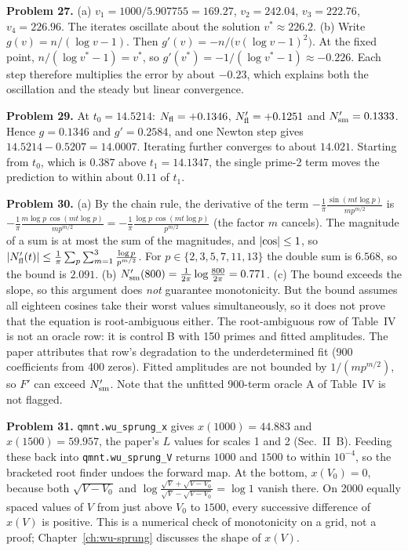 \textbf{Problem 27.} (a) $v_1=1000/5.907755=169.27$, $v_2=242.04$, $v_3=222.76$, $v_4=226.96$. The iterates oscillate about the solution $v^\ast\approx226.2$. (b) Write $g(v)=n/(\log v-1)$. Then $g'(v)=-n/\bigl(v(\log v-1)^2\bigr)$. At the fixed point, $n/(\log v^\ast-1)=v^\ast$, so $g'(v^\ast)=-1/(\log v^\ast-1)\approx-0.226$. Each step therefore multiplies the error by about $-0.23$, which explains both the oscillation and the steady but linear convergence.

\textbf{Problem 29.} At $t_0=14.5214$: $N_{\mathrm{fl}}=+0.1346$, $N_{\mathrm{fl}}'=+0.1251$ and $N_{\mathrm{sm}}'=0.1333$. Hence $g=0.1346$ and $g'=0.2584$, and one Newton step gives $14.5214-0.5207=14.0007$. Iterating further converges to about $14.021$. Starting from $t_0$, which is $0.387$ above $t_1=14.1347$, the single prime-2 term moves the prediction to within about $0.11$ of $t_1$.

\textbf{Problem 30.} (a) By the chain rule, the derivative of the term $-\frac1\pi\frac{\sin(mt\log p)}{mp^{m/2}}$ is $-\frac1\pi\frac{m\log p\,\cos(mt\log p)}{mp^{m/2}}=-\frac1\pi\frac{\log p\,\cos(mt\log p)}{p^{m/2}}$ (the factor $m$ cancels). The magnitude of a sum is at most the sum of the magnitudes, and $\left\lvert \cos\right\rvert\le1$, so $\left\lvert N_{\mathrm{fl}}'(t)\right\rvert\le\frac1\pi\sum_p\sum_{m=1}^3\frac{\log p}{p^{m/2}}$. For $p\in\{2,3,5,7,11,13\}$ the double sum is $6.568$, so the bound is $2.091$. (b) $N_{\mathrm{sm}}'(800)=\frac1{2\pi}\log\frac{800}{2\pi}=0.771$. (c) The bound exceeds the slope, so this argument does \emph{not} guarantee monotonicity. But the bound assumes all eighteen cosines take their worst values simultaneously, so it does not prove that the equation is root-ambiguous either. The root-ambiguous row of Table~IV is not an oracle row: it is control B with 150 primes and fitted amplitudes. The paper attributes that row's degradation to the underdetermined fit (900 coefficients from 400 zeros). Fitted amplitudes are not bounded by $1/(mp^{m/2})$, so $F'$ can exceed $N_{\mathrm{sm}}'$. Note that the unfitted 900-term oracle A of Table~IV is not flagged.

\textbf{Problem 31.} \texttt{qmnt.wu\_sprung\_x} gives $x(1000)=44.883$ and $x(1500)=59.957$, the paper's $L$ values for scales 1 and 2 (Sec.~II~B). Feeding these back into \texttt{qmnt.wu\_sprung\_V} returns $1000$ and $1500$ to within $10^{-4}$, so the bracketed root finder undoes the forward map. At the bottom, $x(V_0)=0$, because both $\sqrt{V-V_0}$ and $\log\frac{\sqrt V+\sqrt{V-V_0}}{\sqrt V-\sqrt{V-V_0}}=\log1$ vanish there. On 2000 equally spaced values of $V$ from just above $V_0$ to $1500$, every successive difference of $x(V)$ is positive. This is a numerical check of monotonicity on a grid, not a proof; Chapter~\ref{ch:wu-sprung} discusses the shape of $x(V)$.
